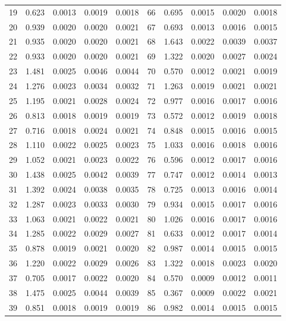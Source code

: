 \documentclass[12pt, leqno]{article}
\begin{document}
\begin{table}[ht]
{\begin{tabular}{r|r|r|r|r|r|r|r|r|r}
  19 & 0.623 & 0.0013 & 0.0019 & 0.0018 & 66 & 0.695 & 0.0015 & 0.0020 & 0.0018 \\ 
  20 & 0.939 & 0.0020 & 0.0020 & 0.0021 & 67 & 0.693 & 0.0013 & 0.0016 & 0.0015 \\ 
  21 & 0.935 & 0.0020 & 0.0020 & 0.0021 & 68 & 1.643 & 0.0022 & 0.0039 & 0.0037 \\ 
  22 & 0.933 & 0.0020 & 0.0020 & 0.0021 & 69 & 1.322 & 0.0020 & 0.0027 & 0.0024 \\ 
  23 & 1.481 & 0.0025 & 0.0046 & 0.0044 & 70 & 0.570 & 0.0012 & 0.0021 & 0.0019 \\ 
  24 & 1.276 & 0.0023 & 0.0034 & 0.0032 & 71 & 1.263 & 0.0019 & 0.0021 & 0.0021 \\ 
  25 & 1.195 & 0.0021 & 0.0028 & 0.0024 & 72 & 0.977 & 0.0016 & 0.0017 & 0.0016 \\ 
  26 & 0.813 & 0.0018 & 0.0019 & 0.0019 & 73 & 0.572 & 0.0012 & 0.0019 & 0.0018 \\ 
  27 & 0.716 & 0.0018 & 0.0024 & 0.0021 & 74 & 0.848 & 0.0015 & 0.0016 & 0.0015 \\ 
  28 & 1.110 & 0.0022 & 0.0025 & 0.0023 & 75 & 1.033 & 0.0016 & 0.0018 & 0.0016 \\ 
  29 & 1.052 & 0.0021 & 0.0023 & 0.0022 & 76 & 0.596 & 0.0012 & 0.0017 & 0.0016 \\ 
  30 & 1.438 & 0.0025 & 0.0042 & 0.0039 & 77 & 0.747 & 0.0012 & 0.0014 & 0.0013 \\ 
  31 & 1.392 & 0.0024 & 0.0038 & 0.0035 & 78 & 0.725 & 0.0013 & 0.0016 & 0.0014 \\ 
  32 & 1.287 & 0.0023 & 0.0033 & 0.0030 & 79 & 0.934 & 0.0015 & 0.0017 & 0.0016 \\ 
  33 & 1.063 & 0.0021 & 0.0022 & 0.0021 & 80 & 1.026 & 0.0016 & 0.0017 & 0.0016 \\ 
  34 & 1.285 & 0.0022 & 0.0029 & 0.0027 & 81 & 0.633 & 0.0012 & 0.0017 & 0.0014 \\ 
  35 & 0.878 & 0.0019 & 0.0021 & 0.0020 & 82 & 0.987 & 0.0014 & 0.0015 & 0.0015 \\ 
  36 & 1.220 & 0.0022 & 0.0029 & 0.0026 & 83 & 1.322 & 0.0018 & 0.0023 & 0.0020 \\ 
  37 & 0.705 & 0.0017 & 0.0022 & 0.0020 & 84 & 0.570 & 0.0009 & 0.0012 & 0.0011 \\ 
  38 & 1.475 & 0.0025 & 0.0044 & 0.0039 & 85 & 0.367 & 0.0009 & 0.0022 & 0.0021 \\ 
  39 & 0.851 & 0.0018 & 0.0019 & 0.0019 & 86 & 0.982 & 0.0014 & 0.0015 & 0.0015 \\ 

\end{tabular}}
\end{table}
\end{document}
